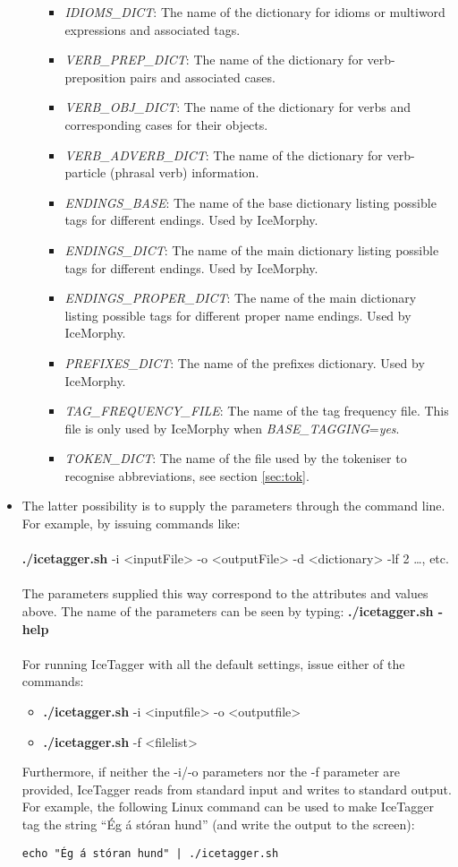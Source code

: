 \documentclass[11pt]{article}
\begin{document}
\begin{itemize}
\begin{itemize}
\begin{itemize}
\item \emph{IDIOMS\_DICT}: The name of the dictionary for idioms or multiword expressions and associated tags.
\item \emph{VERB\_PREP\_DICT}: The name of the dictionary for verb-preposition pairs and associated cases.
\item \emph{VERB\_OBJ\_DICT}: The name of the dictionary for verbs and corresponding cases for their objects.
\item \emph{VERB\_ADVERB\_DICT}: The name of the dictionary for verb-particle (phrasal verb) information.
\item \emph{ENDINGS\_BASE}: The name of the base dictionary listing possible tags for different endings. Used by IceMorphy.
\item \emph{ENDINGS\_DICT}: The name of the main dictionary listing possible tags for different endings. Used by IceMorphy.
\item \emph{ENDINGS\_PROPER\_DICT}: The name of the main dictionary listing possible tags for different proper name endings. Used by IceMorphy.
\item \emph{PREFIXES\_DICT}: The name of the prefixes dictionary. Used by IceMorphy.
\item \emph{TAG\_FREQUENCY\_FILE}: The name of the tag frequency file. This file is only used by IceMorphy when \emph{BASE\_TAGGING}=\emph{yes}.
\item \emph{TOKEN\_DICT}: The name of the file used by the tokeniser to recognise abbreviations, see section \ref{sec:tok}.
\end{itemize}
\end{itemize}
\item The latter possibility is to supply the parameters through the command line. For example, by issuing commands like: \\ \\
\textbf{./icetagger.sh} -i <inputFile> -o <outputFile> -d <dictionary> -lf 2 \ldots, etc. \\ \\
The parameters supplied this way correspond to the attributes and values above.
The name of the parameters can be seen by typing: \textbf{./icetagger.sh -help} \\ \\
For running IceTagger with all the default settings, issue either of the commands: 
\begin{itemize} 
\item \textbf{./icetagger.sh} -i <inputfile> -o <outputfile>
\item \textbf{./icetagger.sh} -f <filelist> 
\end{itemize}

Furthermore, if neither the -i/-o parameters nor the -f parameter are provided, IceTagger reads from standard input and writes to standard output. For example, the following Linux command can be used to make IceTagger tag the string ``Ég á stóran hund'' (and write the output to the screen): 
\begin{verbatim}
echo "Ég á stóran hund" | ./icetagger.sh 
\end{verbatim}

\end{itemize}
\end{document}
